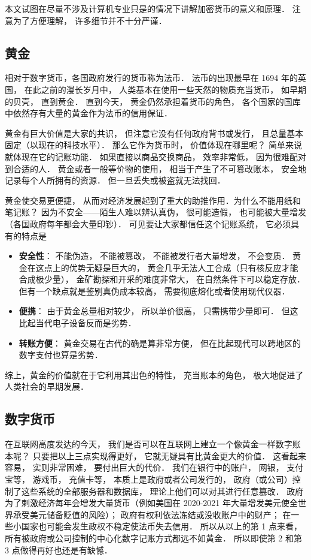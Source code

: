 
本文试图在尽量不涉及计算机专业只是的情况下讲解加密货币的意义和原理． 注意为了方便理解， 许多细节并不十分严谨．

\subsection{黄金}
相对于数字货币，各国政府发行的货币称为法币． 法币的出现最早在 1694 年的英国， 在此之前的漫长岁月中， 人类基本在使用一些天然的物质充当货币， 如早期的贝壳， 直到黄金． 直到今天， 黄金仍然承担着货币的角色， 各个国家的国库中依然存有大量的黄金作为法币的信用保证．

黄金有巨大价值是大家的共识， 但注意它没有任何政府背书或发行， 且总量基本固定（以现在的科技水平）． 那么它作为货币时， 价值体现在哪里呢？ 简单来说就体现在它的记账功能． 如果直接以商品交换商品， 效率非常低， 因为很难配对到合适的人． 黄金或者一般等价物的使用， 相当于产生了不可篡改账本， 安全地记录每个人所拥有的资源． 但一旦丢失或被盗就无法找回．

黄金使交易更便捷， 从而对经济发展起到了重大的助推作用．为什么不能用纸和笔记账？ 因为不安全——陌生人难以辨认真伪， 很可能造假， 也可能被大量增发（各国政府每年都会大量印钞）． 可见要让大家都信任这个记账系统， 它必须具有的特点是
\begin{itemize}
\item \textbf{安全性}： 不能伪造， 不能被篡改， 不能被发行者大量增发， 不会变质． 黄金在这点上的优势无疑是巨大的， 黄金几乎无法人工合成（只有核反应才能合成极少量）， 金矿勘探和开采的难度非常大， 在自然条件下可以稳定存放． 但有一个缺点就是鉴别真伪成本较高， 需要彻底熔化或者使用现代仪器．
\item \textbf{便携}： 由于黄金总量相对较少， 所以单价很高， 只需携带少量即可． 但这比起当代电子设备反而是劣势．
\item \textbf{转账方便}： 黄金交易在古代的确是算非常方便， 但在比起现代可以跨地区的数字支付也算是劣势．
\end{itemize}

综上，黄金的价值就在于它利用其出色的特性， 充当账本的角色， 极大地促进了人类社会的早期发展．

\subsection{数字货币}
在互联网高度发达的今天， 我们是否可以在互联网上建立一个像黄金一样数字账本呢？ 只要把以上三点实现得更好， 它就无疑具有比黄金更大的价值． 这看起来容易， 实则非常困难， 要付出巨大的代价． 我们在银行中的账户， 网银， 支付宝等， 游戏币， 充值卡等， 本质上是政府或者公司发行的， 政府（或公司）控制了这些系统的全部服务器和数据库， 理论上他们可以对其进行任意篡改． 政府为了刺激经济每年会增发大量货币（例如美国在 2020-2021 年大量增发美元使全世界承受美元储备贬值的风险）； 政府有权利依法冻结或没收账户中的财产； 在一些小国家也可能会发生政权不稳定使法币失去信用． 所以从以上的第 1 点来看， 所有被政府或公司控制的中心化数字记账方式都远不如黄金． 所以即使第 2 和第 3 点做得再好也还是有缺憾．

